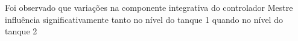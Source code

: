 Foi observado que variações na componente integrativa do controlador Mestre influência significativamente
tanto no nível do tanque 1 quando no nível do tanque 2 